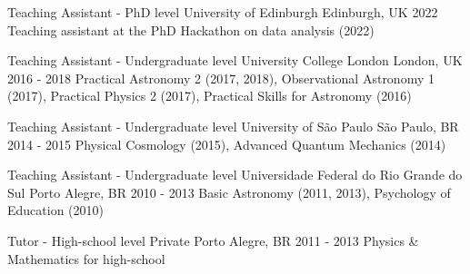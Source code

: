 

\begin{cventries}

  \cventry
    {Teaching Assistant - PhD level} %
    {University of Edinburgh} %
    {Edinburgh, UK} %
    {2022} %
    {
        Teaching assistant at the PhD Hackathon on data analysis (2022)
    }


  \cventry
    {Teaching Assistant - Undergraduate level} %
    {University College London} %
    {London, UK} %
    {2016 - 2018} %
    {
        Practical Astronomy 2 (2017, 2018), Observational Astronomy 1 (2017), Practical Physics 2 (2017), Practical Skills for Astronomy (2016)
    }

  \cventry
    {Teaching Assistant - Undergraduate level} %
    {University of S\~{a}o Paulo} %
    {S\~{a}o Paulo, BR} %
    {2014 - 2015} %
    {
        Physical Cosmology (2015), Advanced Quantum Mechanics (2014)
    }

  \cventry
    {Teaching Assistant - Undergraduate level} %
    {Universidade Federal do Rio Grande do Sul} %
    {Porto Alegre, BR} %
    {2010 - 2013} %
    {
        Basic Astronomy (2011, 2013), Psychology of Education (2010)
    }

  \cventry
    {Tutor - High-school level} %
    {Private} %
    {Porto Alegre, BR} %
    {2011 - 2013} %
    {
        Physics \& Mathematics for high-school
    }
\end{cventries}
